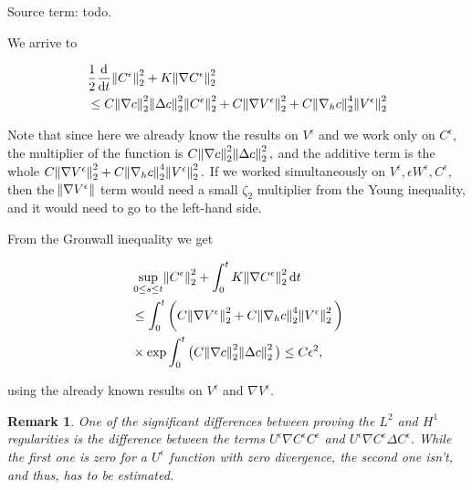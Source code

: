 \documentclass[11pt]{article}
\newtheorem{remark}{Remark}
\newcommand*\diff{\mathop{}\!\mathrm{d}}
\begin{document}
Source term:  todo.

We arrive to

\begin{equation} \nonumber
  \begin{split}
    & \frac{1}{2}\frac{\diff}{\diff t} \norm{C^\epsilon}_2^2 + K \norm{\nabla C^\epsilon}_2^2 \\
    & \leq C \norm{\nabla c}_2^2 \norm{\Delta c}_2^2 \norm{C^\epsilon}_2^2 + C \norm{\nabla V^\epsilon}_2^2 + C \norm{\nabla_h c}_2^4 \norm{V^\epsilon}_2^2
   \end{split}
\end{equation}

Note that since here we already know the results on $V^\epsilon$ and we work only on $C^\epsilon,$ the multiplier of the function is $C \norm{\nabla c}_2^2 \norm{\Delta c}_2^2,$ and the additive term is the whole $C \norm{\nabla V^\epsilon}_2^2 + C \norm{\nabla_h c}_2^4 \norm{V^\epsilon}_2^2.$ If we worked simultaneously on $V^\epsilon, \epsilon W^\epsilon, C^\epsilon,$ then the $\norm{\nabla V^\epsilon}$ term would need a small $\zeta_2$ multiplier from the Young inequality, and it would need to go to the left-hand side.

From the Gronwall inequality we get

\begin{equation} \nonumber
  \begin{split}
    & \sup_{0 \leq s \leq t}{\norm{C^\epsilon}_2^2 } + \int_0^t K \norm{\nabla C^\epsilon}_2^2 \diff t\\
    & \leq \int_0^t \bigg (C \norm{\nabla V^\epsilon}_2^2 + C \norm{\nabla_h c}_2^4 \norm{V^\epsilon}_2^2 \bigg ) \\
    & \times \exp{ \int_0^t \big ( C \norm{\nabla c}_2^2 \norm{\Delta c}_2^2 \big ) } \leq C \epsilon^2,
   \end{split}
\end{equation}

using the already known results on $V^\epsilon$ and $\nabla V^\epsilon.$

\begin{remark}
  One of the significant differences between proving the $L^2$ and $H^1$ regularities is the difference between the terms $U^\epsilon \nabla C^\epsilon C^\epsilon$ and $U^\epsilon \nabla C^\epsilon \Delta C^\epsilon.$ While the first one is zero for a $U^\epsilon$ function with zero divergence, the second one isn't, and thus, has to be estimated.
\end{remark}
\end{document}
